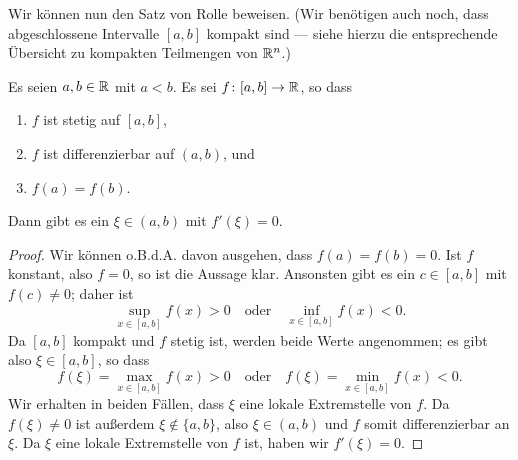 \documentclass[a4paper,10pt]{article}
\begin{document}
Wir können nun den Satz von Rolle beweisen. (Wir benötigen auch noch, dass abgeschlossene Intervalle $[a,b]$ kompakt sind --- siehe hierzu die entsprechende Übersicht zu kompakten Teilmengen von $\mathbb{R}^n$.)


\begin{thrm}
 Es seien $a,b \in \mathbb{R}$ mit $a < b$. Es sei $f \colon [a,b] \to \mathbb{R}$, so dass
 \begin{enumerate}
  \item
   $f$ ist stetig auf $[a,b]$,
  \item
   $f$ ist differenzierbar auf $(a,b)$, und
  \item
   $f(a) = f(b)$.
 \end{enumerate}
 Dann gibt es ein $\xi \in (a,b)$ mit $f'(\xi) = 0$. 
\end{thrm}
\begin{proof}
 Wir können o.B.d.A. davon ausgehen, dass $f(a) = f(b) = 0$.  Ist $f$ konstant, also $f = 0$, so ist die Aussage klar. Ansonsten gibt es ein $c \in [a,b]$ mit $f(c) \neq 0$; daher ist
 \[
  \sup_{x \in [a,b]} f(x) > 0 \quad \text{oder} \quad \inf_{x \in [a,b]} f(x) < 0.
 \]
 Da $[a,b]$ kompakt und $f$ stetig ist, werden beide Werte angenommen; es gibt also $\xi \in [a,b]$, so dass
 \[
  f(\xi) = \max_{x \in [a,b]} f(x) > 0 \quad \text{oder} \quad f(\xi) = \min_{x \in [a,b]} f(x) < 0.
 \]
 Wir erhalten in beiden Fällen, dass $\xi$ eine lokale Extremstelle von $f$. Da $f(\xi) \neq 0$ ist außerdem $\xi \notin \{a,b\}$, also $\xi \in (a,b)$ und $f$ somit differenzierbar an $\xi$. Da $\xi$ eine lokale Extremstelle von $f$ ist, haben wir $f'(\xi) = 0$.
\end{proof}
\end{document}
